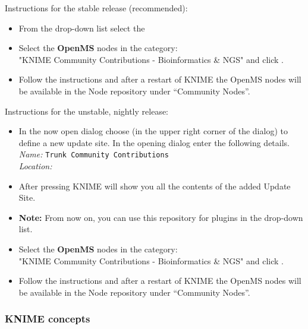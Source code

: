 {
Instructions for the stable release (recommended):
\begin{itemize}
  \item From the  drop-down list select the \\ \menu{\KnimeTrustedSite}
  \item Select the \textbf{OpenMS} nodes in the category: \\ "KNIME Community Contributions - Bioinformatics \& NGS" and click .
  \item Follow the instructions and after a restart of KNIME the OpenMS nodes will be available in the Node repository under “Community Nodes”.
\end{itemize}

Instructions for the unstable, nightly release:
\begin{itemize}
  \item \label{it:add_site} In the now open dialog choose  (in the upper right corner of the dialog) to define a new update site. In the opening dialog enter the following details. \\
  \textit{Name:} \texttt{Trunk Community Contributions} \\
  \textit{Location:} \menu{\KnimeTrunkSite}
  \item \label{it:select_site} After pressing  KNIME will show you all the contents of the added Update Site.
  \item \textbf{Note:} From now on, you can use this repository for plugins in the  drop-down list.
  \item Select the \textbf{OpenMS} nodes in the category: \\ "KNIME Community Contributions - Bioinformatics \& NGS" and click .
  \item Follow the instructions and after a restart of KNIME the OpenMS nodes will be available in the Node repository under “Community Nodes”.
\end{itemize}
}

\subsubsection{KNIME concepts}

